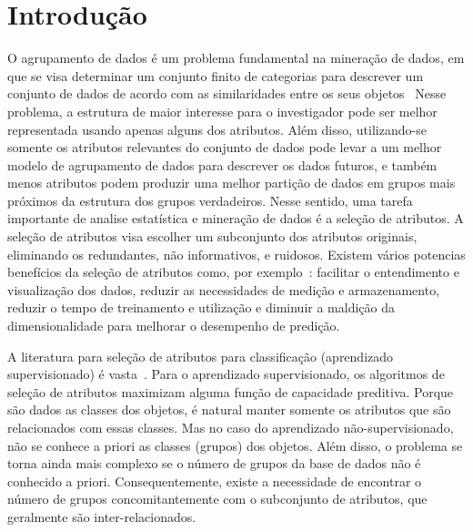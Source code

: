 \documentclass{acm_proc_article-sp}
\begin{document}



\section{Introdução}

% 

O agrupamento de dados é um problema fundamental na mineração de dados, em que se visa determinar um conjunto finito de categorias para descrever um conjunto de dados de acordo com as similaridades entre os seus objetos~\cite{jain1988algorithms, kaufman2009finding, everitt2001clustering, gan2007data}
Nesse problema, a estrutura de maior interesse para o investigador pode ser melhor representada usando apenas alguns dos atributos.
Além disso, utilizando-se somente os atributos relevantes do conjunto de dados pode levar a um melhor modelo de agrupamento de dados para descrever os dados futuros, e também menos atributos podem produzir uma melhor partição de dados em grupos mais próximos da estrutura dos grupos verdadeiros.
Nesse sentido, uma tarefa importante de analise estatística e mineração de dados é a seleção de atributos.
A seleção de atributos visa escolher um subconjunto dos atributos originais, eliminando os redundantes, não informativos, e ruidosos.
Existem vários potencias benefícios da seleção de atributos como, por exemplo~\cite{guyon2003introduction}: facilitar o entendimento e visualização dos dados, reduzir as necessidades de medição e armazenamento, reduzir o tempo de treinamento e utilização e diminuir a maldição da dimensionalidade para melhorar o desempenho de predição.

A literatura para seleção de atributos para classificação (aprendizado supervisionado) é vasta~\cite{dash1997feature, fukunaga1990introduction, almuallim1991learning, kohavi1997wrappers}.
Para o aprendizado supervisionado, os algoritmos de seleção de atributos maximizam alguma função de capacidade preditiva.
Porque são dados as classes dos objetos, é natural manter somente os atributos que são relacionados com essas classes.
Mas no caso do aprendizado não-supervisionado, não se conhece a priori as classes (grupos) dos objetos.
Além disso, o problema se torna ainda mais complexo se o número de grupos da base de dados não é conhecido a priori.
Consequentemente, existe a necessidade de encontrar o número de grupos concomitantemente com o subconjunto de atributos, que geralmente são inter-relacionados.
\end{document}
